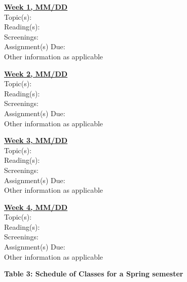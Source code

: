 \documentclass[12pt]{article}
\begin{document}
\noindent \textbf{\underline{Week 1, MM/DD}}
\vspace{0.3em} \\
Topic(s): \\
Reading(s): \\
Screenings: \\
Assignment(s) Due: \\
Other information as applicable

\vspace{0.5em}

\noindent \textbf{\underline{Week 2, MM/DD}}
\vspace{0.3em} \\
Topic(s): \\
Reading(s): \\
Screenings: \\
Assignment(s) Due: \\
Other information as applicable

\vspace{0.5em}

\noindent \textbf{\underline{Week 3, MM/DD}}
\vspace{0.3em} \\
Topic(s): \\
Reading(s): \\
Screenings: \\
Assignment(s) Due: \\
Other information as applicable

\vspace{0.5em}

\noindent \textbf{\underline{Week 4, MM/DD}}
\vspace{0.3em} \\
Topic(s): \\
Reading(s): \\
Screenings: \\
Assignment(s) Due: \\
Other information as applicable

\vspace{0.5em}


\vspace{0.5em}


\begin{center}
\textbf{Table 3: Schedule of Classes for a Spring semester}
\end{center}
\end{document}
